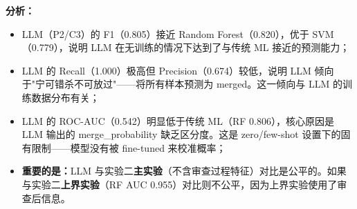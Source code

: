 \documentclass{experimentreport}
\begin{document}
{\textbf{分析：}
\begin{itemize}
    \item LLM（P2/C3）的 F1（0.805）接近 Random Forest（0.820），优于 SVM（0.779），说明 LLM 在无训练的情况下达到了与传统 ML 接近的预测能力；
    \item LLM 的 Recall（1.000）极高但 Precision（0.674）较低，说明 LLM 倾向于"宁可错杀不可放过"——将所有样本预测为 merged。这一倾向与 LLM 的训练数据分布有关；
    \item LLM 的 ROC-AUC（0.542）明显低于传统 ML（RF 0.806），核心原因是 LLM 输出的 merge\_probability 缺乏区分度。这是 zero/few-shot 设置下的固有限制——模型没有被 fine-tuned 来校准概率；
    \item \textbf{重要的是：}LLM 与实验二\textbf{主实验}（不含审查过程特征）对比是公平的。如果与实验二\textbf{上界实验}（RF AUC 0.955）对比则不公平，因为上界实验使用了审查后信息。
\end{itemize}

}

\clearpage

\end{document}
